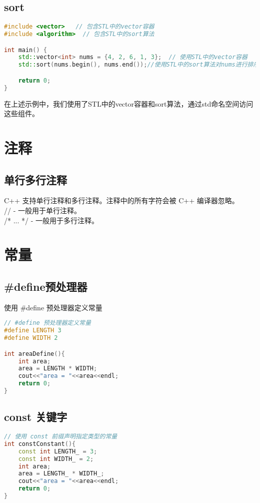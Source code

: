 \documentclass[12pt,twiside,a4paper]{ctexbook}
\numberwithin{chapter}{part}
\begin{document}
\section{sort}
\begin{lstlisting}[language=C++]
#include <vector>   // 包含STL中的vector容器
#include <algorithm>  // 包含STL中的sort算法

int main() {
    std::vector<int> nums = {4, 2, 6, 1, 3};  // 使用STL中的vector容器
    std::sort(nums.begin(), nums.end());//使用STL中的sort算法对nums进行排序

    return 0;
}
\end{lstlisting}
在上述示例中，我们使用了STL中的vector容器和sort算法，通过std命名空间访问这些组件。

\chapter{注释}
\section{单行多行注释}
C++ 支持单行注释和多行注释。注释中的所有字符会被 C++ 编译器忽略。\\
// - 一般用于单行注释。\\
/* ... */ - 一般用于多行注释。

\chapter{常量}
\section{\#define预处理器}
使用 \#define 预处理器定义常量
\begin{lstlisting}[language=C++]
// #define 预处理器定义常量
#define LENGTH 3
#define WIDTH 2

int areaDefine(){
	int area;
	area = LENGTH * WIDTH;
	cout<<"area = "<<area<<endl;
	return 0;
}
\end{lstlisting}

\section{const 关键字}
\begin{lstlisting}[language=C++]
// 使用 const 前缀声明指定类型的常量
int constConstant(){
	const int LENGTH_ = 3;
	const int WIDTH_ = 2;
	int area;
	area = LENGTH_ * WIDTH_;
	cout<<"area = "<<area<<endl; 
	return 0;
}
\end{lstlisting}
\end{document}
